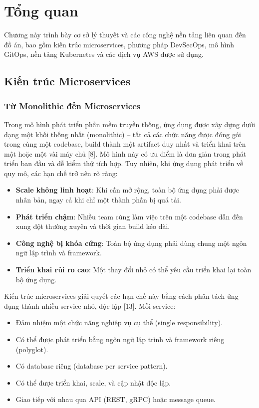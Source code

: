 \documentclass[13pt,a4paper,twoside]{extarticle}
\begin{document}
\newpage

\section{Tổng quan}

Chương này trình bày cơ sở lý thuyết và các công nghệ nền tảng liên quan đến đồ án, bao gồm kiến trúc microservices, phương pháp DevSecOps, mô hình GitOps, nền tảng Kubernetes và các dịch vụ AWS được sử dụng.

\subsection{Kiến trúc Microservices}

\subsubsection{Từ Monolithic đến Microservices}

Trong mô hình phát triển phần mềm truyền thống, ứng dụng được xây dựng dưới dạng một khối thống nhất (monolithic) -- tất cả các chức năng được đóng gói trong cùng một codebase, build thành một artifact duy nhất và triển khai trên một hoặc một vài máy chủ [8]. Mô hình này có ưu điểm là đơn giản trong phát triển ban đầu và dễ kiểm thử tích hợp. Tuy nhiên, khi ứng dụng phát triển về quy mô, các hạn chế trở nên rõ ràng:

\begin{itemize}[leftmargin=*,nosep]
  \item \textbf{Scale không linh hoạt}: Khi cần mở rộng, toàn bộ ứng dụng phải được nhân bản, ngay cả khi chỉ một thành phần bị quá tải.
  \item \textbf{Phát triển chậm}: Nhiều team cùng làm việc trên một codebase dẫn đến xung đột thường xuyên và thời gian build kéo dài.
  \item \textbf{Công nghệ bị khóa cứng}: Toàn bộ ứng dụng phải dùng chung một ngôn ngữ lập trình và framework.
  \item \textbf{Triển khai rủi ro cao}: Một thay đổi nhỏ có thể yêu cầu triển khai lại toàn bộ ứng dụng.
\end{itemize}

Kiến trúc microservices giải quyết các hạn chế này bằng cách phân tách ứng dụng thành nhiều service nhỏ, độc lập [13]. Mỗi service:

\begin{itemize}[leftmargin=*,nosep]
  \item Đảm nhiệm một chức năng nghiệp vụ cụ thể (single responsibility).
  \item Có thể được phát triển bằng ngôn ngữ lập trình và framework riêng (polyglot).
  \item Có database riêng (database per service pattern).
  \item Có thể được triển khai, scale, và cập nhật độc lập.
  \item Giao tiếp với nhau qua API (REST, gRPC) hoặc message queue.
\end{itemize}
\end{document}
